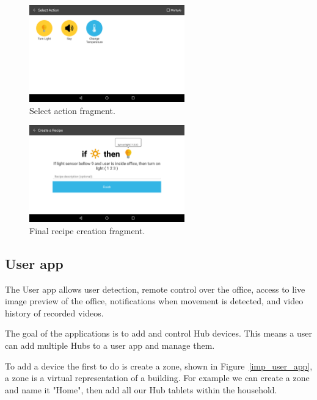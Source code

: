 \begin{figure}[H]
\centering
\includegraphics[width=0.6\textwidth]{Figures/screen_actions}
\caption{Select action fragment.}
\label{screen_actions}
\end{figure}

\begin{figure}[H]
\centering
\includegraphics[width=0.6\textwidth]{Figures/screen_completed_recipe}
\caption{Final recipe creation fragment.}
\label{screen_completed_recipe}
\end{figure}





\subsection{User app}


The User app allows user detection, remote control over the office, access to live image preview of the office, notifications when movement is detected, and video history of recorded videos.

The goal of the applications is to add and control Hub devices. This means a user can add multiple Hubs to a user app and manage them. 

To add a device the first to do is create a zone, shown in Figure~\ref{imp_user_app}, a zone is a virtual representation of a building. For example we can create a zone and name it "Home", then add all our Hub tablets within the household. 

